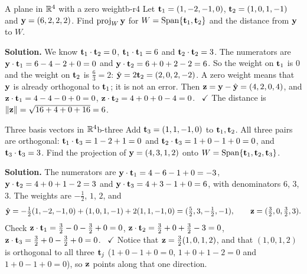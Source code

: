 \documentclass[11pt]{article}
\begin{document}
\begin{exmp}{A plane in $\mathbb{R}^4$ with a zero weight}{b-r4}
Let $\mathbf{t}_1=(1,-2,-1,0)$, $\mathbf{t}_2=(1,0,1,-1)$ and $\mathbf{y}=(6,2,2,2)$. Find $\operatorname{proj}_W\mathbf{y}$ for $W=\operatorname{Span}\{\mathbf{t}_1,\mathbf{t}_2\}$ and the distance from $\mathbf{y}$ to $W$.

\textbf{Solution.} We know $\mathbf{t}_1\cdot\mathbf{t}_2=0$, $\mathbf{t}_1\cdot\mathbf{t}_1=6$ and $\mathbf{t}_2\cdot\mathbf{t}_2=3$. The numerators are $\mathbf{y}\cdot\mathbf{t}_1=6-4-2+0=0$ and $\mathbf{y}\cdot\mathbf{t}_2=6+0+2-2=6$. So the weight on $\mathbf{t}_1$ is $0$ and the weight on $\mathbf{t}_2$ is $\tfrac63=2$: $\hat{\mathbf{y}}=2\mathbf{t}_2=(2,0,2,-2)$. A zero weight means that $\mathbf{y}$ is already orthogonal to $\mathbf{t}_1$; it is not an error. Then $\mathbf{z}=\mathbf{y}-\hat{\mathbf{y}}=(4,2,0,4)$, and $\mathbf{z}\cdot\mathbf{t}_1=4-4-0+0=0$, $\mathbf{z}\cdot\mathbf{t}_2=4+0+0-4=0$. \ $\checkmark$ The distance is $\lVert\mathbf{z}\rVert=\sqrt{16+4+0+16}=6$.
\end{exmp}

\begin{exmp}{Three basis vectors in $\mathbb{R}^4$}{b-three}
Add $\mathbf{t}_3=(1,1,-1,0)$ to $\mathbf{t}_1,\mathbf{t}_2$. All three pairs are orthogonal: $\mathbf{t}_1\cdot\mathbf{t}_3=1-2+1=0$ and $\mathbf{t}_2\cdot\mathbf{t}_3=1+0-1+0=0$, and $\mathbf{t}_3\cdot\mathbf{t}_3=3$. Find the projection of $\mathbf{y}=(4,3,1,2)$ onto $W=\operatorname{Span}\{\mathbf{t}_1,\mathbf{t}_2,\mathbf{t}_3\}$.

\textbf{Solution.} The numerators are $\mathbf{y}\cdot\mathbf{t}_1=4-6-1+0=-3$, $\mathbf{y}\cdot\mathbf{t}_2=4+0+1-2=3$ and $\mathbf{y}\cdot\mathbf{t}_3=4+3-1+0=6$, with denominators $6$, $3$, $3$. The weights are $-\tfrac12$, $1$, $2$, and
\[
\hat{\mathbf{y}}=-\tfrac12(1,-2,-1,0)+(1,0,1,-1)+2(1,1,-1,0)=(\tfrac52,3,-\tfrac12,-1),\qquad\mathbf{z}=(\tfrac32,0,\tfrac32,3).
\]
Check $\mathbf{z}\cdot\mathbf{t}_1=\tfrac32-0-\tfrac32+0=0$, $\mathbf{z}\cdot\mathbf{t}_2=\tfrac32+0+\tfrac32-3=0$, $\mathbf{z}\cdot\mathbf{t}_3=\tfrac32+0-\tfrac32+0=0$. \ $\checkmark$ Notice that $\mathbf{z}=\tfrac32(1,0,1,2)$, and that $(1,0,1,2)$ is orthogonal to all three $\mathbf{t}_j$ ($1+0-1+0=0$, $1+0+1-2=0$ and $1+0-1+0=0$), so $\mathbf{z}$ points along that one direction.
\end{exmp}
\end{document}

